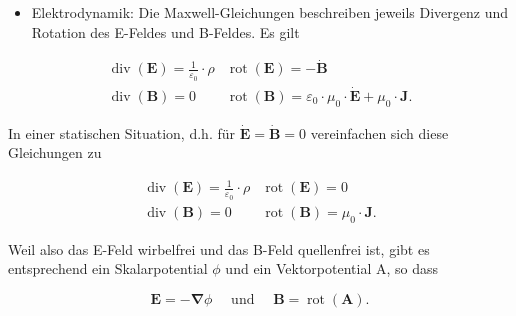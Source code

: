 \documentclass[10pt]{article}
\begin{document}
\begin{itemize}
  \item Elektrodynamik: Die Maxwell-Gleichungen beschreiben jeweils Divergenz und Rotation des E-Feldes und B-Feldes. Es gilt
\end{itemize}

\[
\begin{array}{l|l}
\operatorname{div}(\mathbf{E})=\frac{1}{\varepsilon_{0}} \cdot \rho & \operatorname{rot}(\mathbf{E})=-\dot{\mathbf{B}}  \tag{2.183}\\
\operatorname{div}(\mathbf{B})=0 & \operatorname{rot}(\mathbf{B})=\varepsilon_{0} \cdot \mu_{0} \cdot \dot{\mathbf{E}}+\mu_{0} \cdot \mathbf{J} .
\end{array}
\]

In einer statischen Situation, d.h. für $\dot{\mathbf{E}}=\dot{\mathbf{B}}=0$ vereinfachen sich diese Gleichungen zu

\[
\begin{array}{l|l}
\operatorname{div}(\mathbf{E})=\frac{1}{\varepsilon_{0}} \cdot \rho & \operatorname{rot}(\mathbf{E})=0  \tag{2.184}\\
\operatorname{div}(\mathbf{B})=0 & \operatorname{rot}(\mathbf{B})=\mu_{0} \cdot \mathbf{J} .
\end{array}
\]

Weil also das E-Feld wirbelfrei und das B-Feld quellenfrei ist, gibt es entsprechend ein Skalarpotential $\phi$ und ein Vektorpotential A, so dass


\begin{equation*}
\mathbf{E}=-\boldsymbol{\nabla} \phi \quad \text { und } \quad \mathbf{B}=\operatorname{rot}(\mathbf{A}) . \tag{2.185}
\end{equation*}
\end{document}
